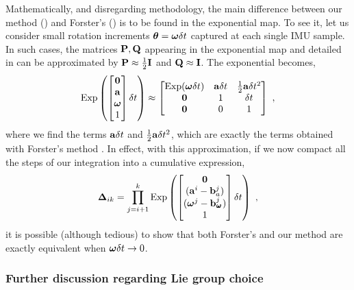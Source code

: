 Mathematically, and disregarding methodology, the main difference between our method () and Forster's \cite{forster2017-TRO} () is to be found in the exponential map. 
To see it, let us consider small rotation increments ${{\bm \theta}}={{\bm \omega}}\delta t$ captured at each single IMU sample. 
In such cases, the matrices ${\bf P},{\bf Q}$ appearing in the exponential map  and detailed in  can be approximated by ${\bf P}\approx\tfrac12{\bf I}$ and ${\bf Q}\approx{\bf I}$.
The exponential becomes,
%
\begin{align}
    \operatorname*{Exp}\left(\begin{bmatrix}
    \bf0 \\ {\bf a} \\ {{\bm \omega}} \\ 1
    \end{bmatrix}\delta t\right) \approx \begin{bmatrix}
    \operatorname*{Exp}({{\bm \omega}}\delta t) & {\bf a}\delta t & \tfrac12{\bf a}\delta t^2 \\
    \bf0 & 1 & \delta t \\
    \bf0 & 0 & 1
    \end{bmatrix}
~,
\end{align}
%
where we find the terms ${\bf a}\delta t$ and $\tfrac12{\bf a}\delta t^2$, which are exactly the terms obtained with Forster's method . 
In effect, with this approximation, if we now compact all the steps  of our integration into a cumulative expression,
%
\begin{align}
    {{\bm \Delta}}_{ik} = \prod_{j=i+1}^k \operatorname*{Exp}\left(\begin{bmatrix}
    \bf0 \\ ({\bf a}^i - {\bf b}_a^j) \\ ({{\bm \omega}}^j-{\bf b}_{\prescript{}{}{\pmb{\omega}}_{}}^j) \\ 1
    \end{bmatrix}\delta t\right)
~,
\end{align}
%
it is possible (although tedious) to show that both Forster's and our method are exactly equivalent when ${{\bm \omega}}\delta t\to0$.



\subsubsection{Further discussion regarding Lie group choice}

